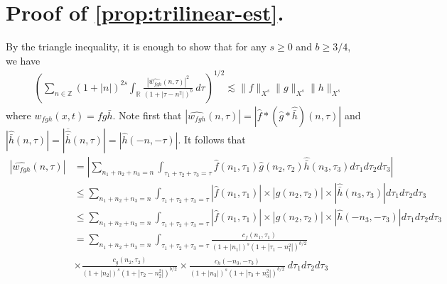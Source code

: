 \documentclass[12pt,reqno]{amsart}
\numberwithin{equation}{section}  %
\numberwithin{figure}{section}
\newcommand{\rr}{\mathbb{R}}
\newcommand{\zz}{\mathbb{Z}}
\newcommand{\wh}{\widehat}
\theoremstyle{plain}
\theoremstyle{definition}
\theoremstyle{remark}
\begin{document}
\section{Proof of \cref{prop:trilinear-est}.}
%
%
By the triangle inequality, it is enough to show that for any $s \ge 0$ and $b
\ge 3/4$, we have
  \begin{equation}
    \label{trilin-est-simp}
    \begin{split}
    & \left( \sum_{n \in \zz} \left (1 + |n| \right )^{2s} \int_\rr
    \frac{|\wh{{w}_{fgh}}(n, \tau) |^2}{\left (1+ |\tau - 
    n^{2}| \right ) ^b} 
     \ d \tau 
    \right)^{1/2}
    \lesssim \|f\|_{X^s} \| g\|_{X^s}
    \| h \|_{X^s}
  \end{split}
  \end{equation}
  where $w_{fgh}(x,t) = f g \bar{h}$.
%
%
%
%
Note first that $|\wh{{w}_{fgh}}(n, \tau) |  = | \wh{f} * ( \wh{g} 
* \wh{\bar h})(n, \tau)|$ and $| \wh{\bar{h}}(n, \tau) | = |\overline{ \wh{\overline{h}} 
}(n, \tau)| = | \wh{h}(-n, -\tau) |$. It follows that
%
%
\begin{equation}
  \label{non-lin-rep}
  \begin{split}
    | \wh{{w}_{fgh}}(n, \tau)|
    & = | \sum_{n_1 + n_2 + n_3 = n}  \int_{\tau_1 + \tau_2 + \tau_3 = \tau} \wh{f}\left( n_1,  \tau_1 
\right) \wh{g}\left( n_2, \tau_2  
\right) \wh{\bar h}\left( n_3, \tau_3 \right) d \tau_1 d \tau_2 d \tau_3 |
\\
& \le \sum_{n_1 + n_2 + n_3 = n}  \int_{\tau_1 + \tau_2 + \tau_3 = \tau} | \wh{f}\left( n_1, \tau_1 
\right) | \times  | \wh{g}\left( n_2, \tau_2 
\right) | \times | \wh{\bar h}\left( n_3, \tau_3 \right) | d \tau_1 d \tau_2 d 
\tau_3
\\
& \le \sum_{n_1 + n_2 + n_3 = n}  \int_{\tau_1 + \tau_2 + \tau_3 = \tau} | \wh{f}\left( n_1, \tau_1 
\right) | \times | \wh{g}\left( n_2, \tau_2 
\right) | \times | \wh{h}\left( -n_3, - \tau_3 \right) | d \tau_1 d \tau_2 d 
\tau_3
\\
& = \sum_{n_1 + n_2 + n_3 = n} \int_{\tau_1 + \tau_2 + \tau_3 = \tau} \frac{c_f\left( n_1, \tau_1 
\right)}{\left (1 + |n_1| \right )^s \left( 1 + | \tau_1 - n_1^2 | \right)^{b/2}}
\\
& \times \frac{c_{g}\left( n_2, \tau_2 \right)}{\left (1 + |n_2| \right ) 
^s\left( 1 + | \tau_2 -  n_2^2| 
\right)^{b/2}}
 \times \frac{c_{h}\left( -n_3, -\tau_3 \right)}{\left (1 + |n_3| \right ) ^s\left( 1 + | 
\tau_3 + n_3^2 | \right)^{b/2}} \ d \tau_1 d \tau_2 d \tau_3
\end{split}
\end{equation}
\end{document}
